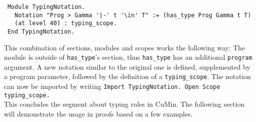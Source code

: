 \documentclass[fleqn]{scrreprt}
\newcommand{\coqinline}[1]{\texttt{#1}}
\begin{document}
 \begin{verbatim}
 Module TypingNotation.
   Notation "Prog > Gamma '|-' t '\in' T" := (has_type Prog Gamma t T)
   (at level 40) : typing_scope.
 End TypingNotation.
 \end{verbatim}
 This combination of sections, modules and scopes works the following way: The module is outside of \coqinline{has_type}'s section, thus \coqinline{has_type} has an additional \coqinline{program} argument. A new notation similar to the original one is defined, supplemented by a program parameter, followed by the definition of a \coqinline{typing_scope}.
 The notation can now be imported by writing \coqinline{Import TypingNotation. Open Scope typing_scope.}\\
 This concludes the segment about typing rules in CuMin. The following section will demonstrate the usage in proofs based on a few examples.
\end{document}
